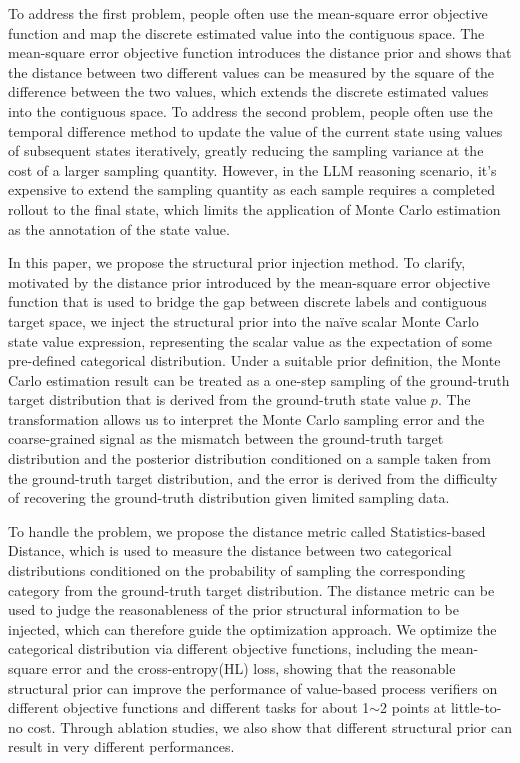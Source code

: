 To address the first problem, people often use the mean-square error objective function and map the discrete estimated value into the contiguous space\citep{lu2024autopsv, DBLP:journals/corr/abs-2406-06592,DBLP:journals/corr/abs-2408-03314}. The mean-square error objective function introduces the distance prior and shows that the distance between two different values can be measured by the square of the difference between the two values, which extends the discrete estimated values into the contiguous space. To address the second problem, people often use the temporal difference method to update the value of the current state using values of subsequent states iteratively, greatly reducing the sampling variance at the cost of a larger sampling quantity\citep{DBLP:journals/tac/TsitsiklisR97,DBLP:journals/corr/abs-2407-04811}. However, in the LLM reasoning scenario, it's expensive to extend the sampling quantity as each sample requires a completed rollout to the final state, which limits the application of Monte Carlo estimation as the annotation of the state value.

In this paper, we propose the structural prior injection method. To clarify, motivated by the distance prior introduced by the mean-square error objective function that is used to bridge the gap between discrete labels and contiguous target space, we inject the structural prior into the na\"ive scalar Monte Carlo state value expression, representing the scalar value as the expectation of some pre-defined categorical distribution. Under a suitable prior definition, the Monte Carlo estimation result can be treated as a one-step sampling of the ground-truth target distribution that is derived from the ground-truth state value $p$. The transformation allows us to interpret the Monte Carlo sampling error and the coarse-grained signal as the mismatch between the ground-truth target distribution and the posterior distribution conditioned on a sample taken from the ground-truth target distribution, and the error is derived from the difficulty of recovering the ground-truth distribution given limited sampling data.

To handle the problem, we propose the distance metric called Statistics-based Distance, which is used to measure the distance between two categorical distributions conditioned on the probability of sampling the corresponding category from the ground-truth target distribution. The distance metric can be used to judge the reasonableness of the prior structural information to be injected, which can therefore guide the optimization approach. We optimize the categorical distribution via different objective functions, including the mean-square error and the cross-entropy(HL) loss\citep{DBLP:conf/icml/ImaniW18}, showing that the reasonable structural prior can improve the performance of value-based process verifiers on different objective functions and different tasks for about 1$\sim$2 points at little-to-no cost. Through ablation studies, we also show that different structural prior can result in very different performances.

